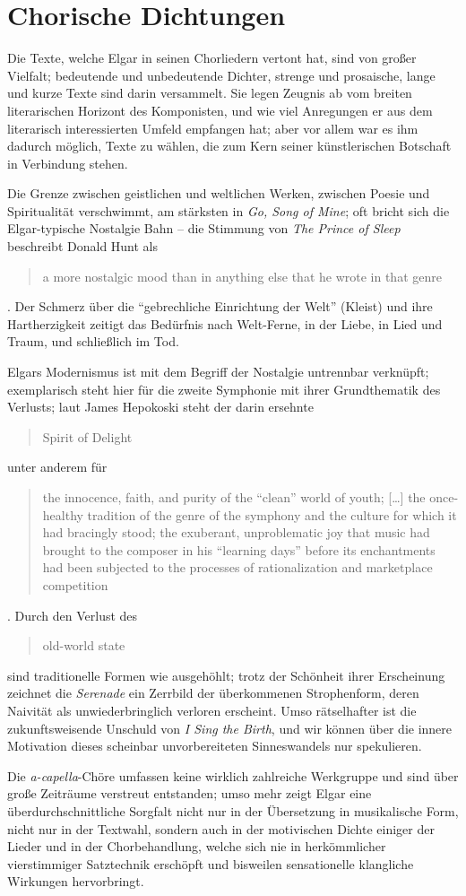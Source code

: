 \documentclass[a4paper,11pt,open=any]{scrbook}
\newcommand{\engquote}[1]{\foreignblockquote{english}{#1}}
\begin{document}
\section{Chorische Dichtungen}
Die Texte, welche Elgar in seinen Chorliedern vertont hat, sind von großer
Vielfalt; bedeutende und unbedeutende Dichter, strenge und prosaische, lange
und kurze Texte sind darin versammelt.  Sie legen Zeugnis ab vom breiten
literarischen Horizont des Komponisten, und wie viel Anregungen er aus dem
literarisch interessierten Umfeld empfangen hat; aber vor allem war es ihm
dadurch möglich, Texte zu wählen, die zum Kern seiner künstlerischen Botschaft
in Verbindung stehen.

Die Grenze zwischen geistlichen und weltlichen Werken, zwischen Poesie und
Spiritualität verschwimmt, am stärksten in \textit{Go, Song of Mine}; oft
bricht sich die Elgar-typische Nostalgie Bahn – die Stimmung von \textit{The
Prince of Sleep} beschreibt Donald Hunt als \engquote{a more nostalgic mood
than in anything else that he wrote in that genre}\cite[S.~x]{ece13}.  Der
Schmerz über die \enquote{gebrechliche Einrichtung der Welt} (Kleist) und
ihre Hartherzigkeit zeitigt das Bedürfnis nach Welt-Ferne, in der Liebe,
in Lied und Traum, und schließlich im Tod.

Elgars Modernismus ist mit dem Begriff der Nostalgie untrennbar verknüpft;
exemplarisch steht hier für die zweite Symphonie mit ihrer Grundthematik
des Verlusts; laut James Hepokoski steht der darin ersehnte \engquote{Spirit
of Delight} unter anderem für \engquote{the innocence, faith, and purity of
the \enquote{clean} world of youth; […] the once-healthy tradition of the
genre of the symphony and the culture for which it had bracingly stood;
the exuberant, unproblematic joy that music had brought to the composer
in his \enquote{learning days} before its enchantments had been subjected
to the processes of rationalization and marketplace competition}\cite
[zitiert nach][S.~159]{mark}.
Durch den Verlust des \engquote{old-world state} sind traditionelle
Formen wie ausgehöhlt; trotz der Schönheit ihrer Erscheinung zeichnet
die \textit{Serenade} ein Zerrbild der überkommenen Strophenform, deren
Naivität als unwiederbringlich verloren erscheint.  Umso rätselhafter
ist die zukunftsweisende Unschuld von \textit{I Sing the Birth}, und
wir können über die innere Motivation dieses scheinbar unvorbereiteten
Sinneswandels nur spekulieren.

Die \textit{a-capella}-Chöre umfassen keine wirklich zahlreiche Werkgruppe
und sind über große Zeiträume verstreut entstanden; umso mehr zeigt Elgar
eine überdurchschnittliche Sorgfalt nicht nur in der Übersetzung in
musikalische Form, nicht nur in der Textwahl, sondern auch in der
motivischen Dichte einiger der Lieder und in der Chorbehandlung,
welche sich nie in herkömmlicher vierstimmiger Satztechnik erschöpft
und bisweilen sensationelle klangliche Wirkungen hervorbringt.
\end{document}
